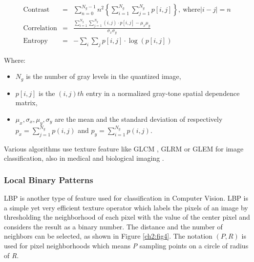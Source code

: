 \begin{eqnarray}
\textrm{Contrast} & = & \sum_{n=0}^{N_g-1} n^{2} \left\{ \sum_{i=1}^{N_g} \sum_{j=1}^{N_g} p[i,j] \right\}, \ \textrm{where} |i-j| = n \\
\textrm{Correlation} & = & \frac{ \sum_{i=1}^{N_g} \sum_{j=1}^{N_g} (i,j) \cdot p[i,j] - \mu_x \mu_y }{\sigma_x \sigma_y} \\
\textrm{Entropy} & = & - \sum_{i} \sum_{j} p[i,j] \cdot \log(p[i,j])
\end{eqnarray}

Where:
\begin{itemize}
 \item $N_g$ is the number of gray levels in the quantized image,
 \item $p[i,j]$ is the $(i,j)th$ entry in a normalized gray-tone spatial dependence matrix,
 \item $\mu_x,\sigma_x,\mu_y,\sigma_y$ are the mean and the standard deviation of respectively $p_x = \sum_{j=1}^{N_g}p(i,j)$ and  $p_y = \sum_{i=1}^{N_g}p(i,j)$.
\end{itemize}

Various algorithms use texture feature like \Gls{GLCM} \cite{texture03}, \Gls{GLRM} \cite{texture02} or \Gls{GLEM} for image classification,
also in medical \cite{texture04} and biological imaging \cite{textGLCMbiol}.


\subsubsection{Local Binary Patterns}

\Gls{LBP} is another type of feature used for classification in Computer Vision. \Gls{LBP} is a simple yet very efficient texture operator
which labels the pixels of an image by thresholding the neighborhood of each pixel with the value of the center pixel and considers the result as a binary number.
The distance and the number of neighbors can be selected, as shown in Figure \ref{ch2:fig4}\cite{LBP01}.
The notation $(P,R)$ is used for pixel neighborhoods which means \textit{P} sampling points on a circle of radius of \textit{R}.

